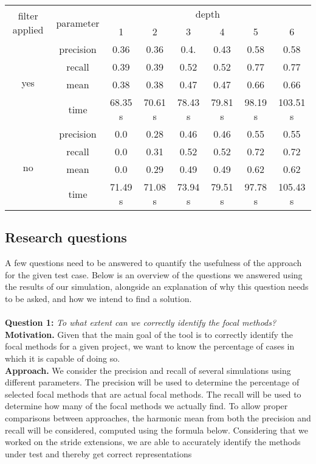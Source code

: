 \documentclass[11pt]{article}
\begin{document}
\begin{multicols}{2}
\begin{table*}[t]
	\centering
	\begin{tabular}{ |c|c|c|c|c|c|c|c|  }
		\hline
		\multirow{2}{*}{filter applied} & \multirow{2}{*}{parameter} & \multicolumn{6}{|c|}{depth} \\
		\cline{3-8}
		& & 1 & 2 & 3 & 4 & 5 & 6\\
		\hline
		\multirow{4}{*}{yes} & precision & 0.36 & 0.36 & 0.4. & 0.43 & 0.58 & 0.58\\
		\cline{2-8}
		& recall & 0.39 & 0.39 & 0.52 & 0.52 & 0.77 & 0.77\\
		\cline{2-8}
		& mean & 0.38 & 0.38 & 0.47 & 0.47 & 0.66 & 0.66\\
		\cline{2-8}
		& time & 68.35 s &  70.61 s & 78.43 s  & 79.81 s & 98.19 s & 103.51 s \\
		\hline
		\multirow{4}{*}{no} & precision & 0.0 & 0.28 & 0.46 & 0.46 & 0.55 & 0.55\\
		\cline{2-8}
		& recall & 0.0 & 0.31 & 0.52 & 0.52 & 0.72 & 0.72\\
		\cline{2-8}
		& mean & 0.0 & 0.29 & 0.49 & 0.49 & 0.62 & 0.62\\
		\cline{2-8}
		& time & 71.49 s &  71.08 s & 73.94 s & 79.51 s & 97.78 s & 105.43 s\\
		\hline
	\end{tabular}
\end{table*}

\subsection{Research questions}
A few questions need to be answered to quantify the usefulness of the approach for the given test case. Below is an overview of the questions we answered using the results of our simulation, alongside an explanation of why this question needs to be asked, and how we intend to find a solution.\\
\\
\noindent
\textbf{Question 1:} \textit{To what extent can we correctly identify the focal methods?}\\
\textbf{Motivation.} Given that the main goal of the tool is to correctly identify the focal methods for a given project, we want to know the percentage of cases in which it is capable of doing so. \\
\textbf{Approach.} We consider the precision and recall of several simulations using different parameters. The precision will be used to determine the percentage of selected focal methods that are actual focal methods. The recall will be used to determine how many of the focal methods we actually find. To allow proper comparisons between approaches, the harmonic mean from both the precision and recall will be considered, computed using the formula below. Considering that we worked on the stride extensions, we are able to accurately identify the methods under test and thereby get correct representations 


\end{multicols}
\end{document}
